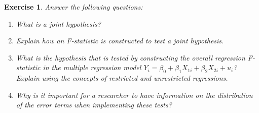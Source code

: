 \documentclass{article}
\newtheorem{exercise}[theorem]{Exercise}
\begin{document}
\begin{exercise} %
Answer the following questions:
\begin{enumerate}[label=(\alph*)]
\item What is a joint hypothesis?
\item Explain how an F-statistic is constructed to test a joint hypothesis.
\item What is the hypothesis that is tested by constructing the overall regression F-statistic in the multiple regression model $Y_i = \beta_0 + \beta_1 X_{1i} + \beta_2 X_{2i} + u_i$? Explain using the concepts of restricted and unrestricted regressions.
\item Why is it important for a researcher to have information on the distribution of the error terms when implementing these tests?
\end{enumerate}
\end{exercise}
\end{document}
